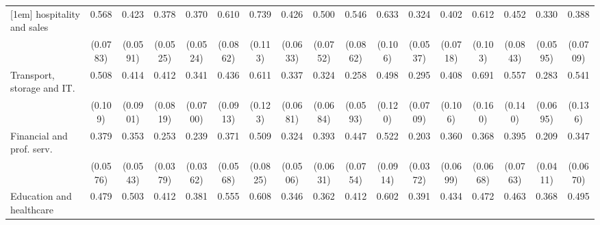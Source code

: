 {\begin{tabular}{l*{16}{c}}
[1em]
hospitality and sales&       0.568\sym{***}&       0.423\sym{***}&       0.378\sym{***}&       0.370\sym{***}&       0.610\sym{***}&       0.739\sym{*}  &       0.426\sym{***}&       0.500\sym{***}&       0.546\sym{***}&       0.633\sym{**} &       0.324\sym{***}&       0.402\sym{***}&       0.612\sym{**} &       0.452\sym{***}&       0.330\sym{***}&       0.388\sym{***}\\
                    &    (0.0783)         &    (0.0591)         &    (0.0525)         &    (0.0524)         &    (0.0862)         &     (0.113)         &    (0.0633)         &    (0.0752)         &    (0.0862)         &     (0.106)         &    (0.0537)         &    (0.0718)         &     (0.103)         &    (0.0843)         &    (0.0595)         &    (0.0709)         \\
[1em]
Transport, storage and IT.&       0.508\sym{**} &       0.414\sym{***}&       0.412\sym{***}&       0.341\sym{***}&       0.436\sym{***}&       0.611\sym{*}  &       0.337\sym{***}&       0.324\sym{***}&       0.258\sym{***}&       0.498\sym{**} &       0.295\sym{***}&       0.408\sym{***}&       0.691         &       0.557\sym{*}  &       0.283\sym{***}&       0.541\sym{*}  \\
                    &     (0.109)         &    (0.0901)         &    (0.0819)         &    (0.0700)         &    (0.0913)         &     (0.123)         &    (0.0681)         &    (0.0684)         &    (0.0593)         &     (0.120)         &    (0.0709)         &     (0.106)         &     (0.160)         &     (0.140)         &    (0.0695)         &     (0.136)         \\
[1em]
Financial and prof. serv.&       0.379\sym{***}&       0.353\sym{***}&       0.253\sym{***}&       0.239\sym{***}&       0.371\sym{***}&       0.509\sym{***}&       0.324\sym{***}&       0.393\sym{***}&       0.447\sym{***}&       0.522\sym{***}&       0.203\sym{***}&       0.360\sym{***}&       0.368\sym{***}&       0.395\sym{***}&       0.209\sym{***}&       0.347\sym{***}\\
                    &    (0.0576)         &    (0.0543)         &    (0.0379)         &    (0.0362)         &    (0.0568)         &    (0.0825)         &    (0.0506)         &    (0.0631)         &    (0.0754)         &    (0.0914)         &    (0.0372)         &    (0.0699)         &    (0.0668)         &    (0.0763)         &    (0.0411)         &    (0.0670)         \\
[1em]
Education and healthcare&       0.479\sym{***}&       0.503\sym{***}&       0.412\sym{***}&       0.381\sym{***}&       0.555\sym{***}&       0.608\sym{**} &       0.346\sym{***}&       0.362\sym{***}&       0.412\sym{***}&       0.602\sym{**} &       0.391\sym{***}&       0.434\sym{***}&       0.472\sym{***}&       0.463\sym{***}&       0.368\sym{***}&       0.495\sym{***}\\

\end{tabular}}
